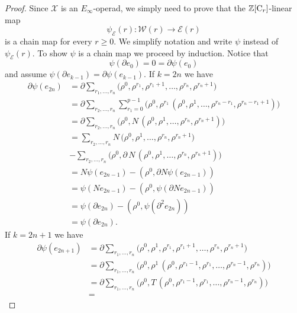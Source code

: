 \begin{proof}
	Since $\mathcal X$ is an $E_\infty$-operad, we simply need to prove that the $\mathbb{Z}[\mathrm{C}_r]$-linear map
	\begin{equation*}
	\psi_{\mathcal E}(r) \colon \mathcal W(r) \to \mathcal E(r)
	\end{equation*}
	is a chain map for every $r \geq 0$.
	We simplify notation and write $\psi$ instead of $\psi_{\mathcal E}(r)$.
	To show $\psi$ is a chain map we proceed by induction.
	Notice that
	\begin{equation*}
	\psi(\partial e_0) = 0 = \partial \psi(e_0)
	\end{equation*}
	and assume $\psi(\partial e_{k-1}) = \partial \psi(e_{k-1})$.
	If $k = 2n$ we have
	\begin{align*}
	\partial \psi(e_{2n}) & =
	\partial \sum_{r_1, \dots, r_n}
	\big(\rho^0, \rho^{r_1}, \rho^{r_1+1}, \dots, \rho^{r_n}, \rho^{r_n+1} \big) \\ & =
	\partial \sum_{r_2, \dots, r_n} \sum_{r_1 = 0}^{p-1}
	\big(\rho^0, \rho^{r_1} \, (\rho^0, \rho^{1}, \dots, \rho^{r_n-r_1}, \rho^{r_n - r_1 +1}) \big) \\ & =
	\partial \sum_{r_2, \dots, r_n}
	\big(\rho^0, N\, (\rho^{0}, \rho^{1}, \dots, \rho^{r_n}, \rho^{r_n + 1}) \big) \\ & =
	\sum_{r_2, \dots, r_n}
	N\, \big( \rho^{0}, \rho^{1}, \dots, \rho^{r_n}, \rho^{r_n + 1} \big) \\ & -
	\sum_{r_2, \dots, r_n}
	\big(\rho^0, \partial \, N \, (\rho^{0}, \rho^{1}, \dots, \rho^{r_n}, \rho^{r_n+1}) \big) \\ & =
	N \psi(e_{2n-1}) - (\rho^0, \partial N \psi (e_{2n-1})) \\ & =
	\psi(N e_{2n-1}) - (\rho^0, \psi (\partial N e_{2n-1})) \\ & =
	\psi(\partial e_{2n}) - (\rho^0, \psi (\partial^2 e_{2n})) \\ & =
	\psi(\partial e_{2n}).
	\end{align*}
	If $k = 2n+1$ we have
	\begin{align*}
	\partial \psi(e_{2n+1}) & =
	\partial \sum_{r_1, \dots, r_n}
	\big(\rho^0, \rho^1, \rho^{r_1}, \rho^{r_1+1}, \dots, \rho^{r_n}, \rho^{r_n+1} \big) \\ & =
	\partial \sum_{r_1, \dots, r_n}
	\big(\rho^0, \rho^{1} \, (\rho^0, \rho^{r_1-1}, \rho^{r_1}, \dots, \rho^{r_n - 1}, \rho^{r_n}) \big) \\ & =
	\partial \sum_{r_1, \dots, r_n}
	\big(\rho^0, T\, (\rho^0, \rho^{r_1-1}, \rho^{r_1}, \dots, \rho^{r_n - 1}, \rho^{r_n}) \big) \\ & =

\end{align*}
\end{proof}
